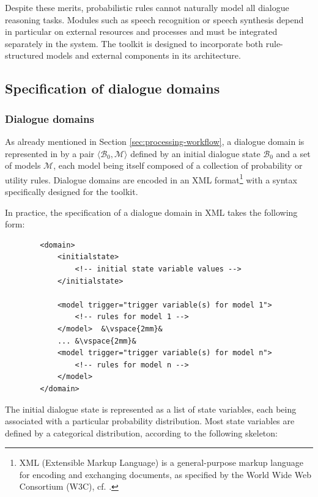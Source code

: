 Despite these merits, probabilistic rules cannot naturally model all dialogue reasoning tasks.  Modules such as speech recognition or speech synthesis depend in particular on external resources and processes and must be integrated separately in the system. The \opendial{} toolkit is designed to incorporate both rule-structured models and external components in its architecture. 
\subsection{Specification of dialogue domains}
\label{sec:domain-specification}

\subsubsection*{Dialogue domains}
As already mentioned in Section \ref{sec:processing-workflow}, a dialogue domain is represented in \opendial{} by a pair $\langle \mathcal{B}_0, \mathcal{M} \rangle$ defined by an initial dialogue state $\mathcal{B}_0$ and a set of models $\mathcal{M}$, each model being itself composed of a collection of probability or utility rules. Dialogue domains are encoded in an XML format\footnote{XML (Extensible Markup Language) is a general-purpose markup language for encoding and exchanging documents, as specified by the World Wide Web Consortium (W3C), cf. .} with a syntax specifically designed for the toolkit. 

In practice, the specification of a dialogue domain in XML takes the following form:
\lstset{language=XML}
\begin{lstlisting}
        <domain> 
            <initialstate>    
                <!-- initial state variable values -->
            </initialstate>

            <model trigger="trigger variable(s) for model 1">
                <!-- rules for model 1 -->
            </model>  &\vspace{2mm}& 
            ... &\vspace{2mm}&
            <model trigger="trigger variable(s) for model n">
                <!-- rules for model n -->
     	    </model>
        </domain>
\end{lstlisting}\vspace{2mm}

The initial dialogue state is represented as a list of state variables, each being associated with a particular probability distribution.  Most state variables are defined by a categorical distribution, according to the following skeleton:

